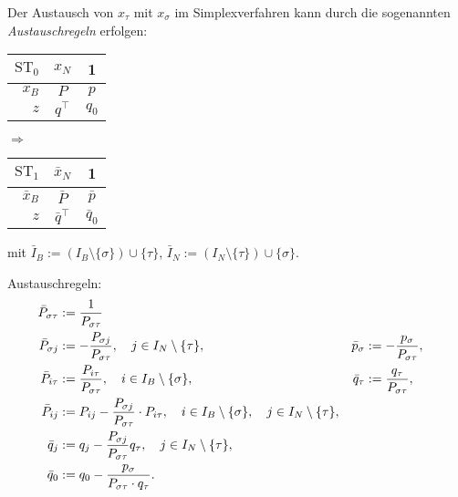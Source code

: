 Der Austausch von $x_\tau$ mit $x_\sigma$ im Simplexverfahren kann durch die
sogenannten \emph{Austauschregeln} erfolgen:
\begin{center}
  \begin{tabular}{r|cc}
    $\mathrm{ST}_0$ & $x_N$ & 1 \\
    \hline
    $x_B$ & $P$ & $p$ \\
    \hline
    $z$ & $q^\top$ & $q_0$
  \end{tabular}
  \hspace{1cm}
  $\Rightarrow$
  \hspace{1cm}
  \begin{tabular}{r|cc}
    $\mathrm{ST}_1$ & $\bar{x}_N$ & 1 \\
    \hline
    $\bar{x}_B$ & $\bar{P}$ & $\bar{p}$ \\
    \hline
    $z$ & $\bar{q}^\top$ & $\bar{q}_0$
  \end{tabular}  
\end{center}
mit $\bar{I}_B := (I_B \setminus \{ \sigma \} ) \cup \{ \tau \}$, $\bar{I}_N :=
(I_N \setminus \{ \tau \} ) \cup \{ \sigma \}$.

Austauschregeln:
\begin{align*}
  \bar{P}_{\sigma \tau}
  &:= \frac{1}{P_{\sigma \tau}} \\
  \bar{P}_{\sigma j}
  &:= - \frac{P_{\sigma j}}{P_{\sigma \tau}}, \quad
    j \in I_N \setminus \{ \tau \},
  & \bar{p}_\sigma
  &:= - \frac{p_\sigma}{P_{\sigma \tau}}, \\
  \bar{P}_{i \tau}
  &:= \frac{P_{i \tau}}{P_{\sigma \tau}}, \quad
    i \in I_B \setminus \{ \sigma \},
  & \bar{q}_\tau
  &:= \frac{q_\tau}{P_{\sigma \tau}}, \\
  \bar{P}_{ij}
  &:= P_{ij} - \frac{P_{\sigma j}}{P_{\sigma \tau}} \cdot P_{i \tau}, \quad
    i \in I_B \setminus \{\sigma\}, \quad j \in I_N \setminus \{ \tau \}, \\
  \bar{q}_j
  &:= q_j - \frac{P_{\sigma j}}{P_{\sigma \tau}} q_\tau, \quad
    j \in I_N \setminus \{ \tau \}, \\
  \bar{q}_0
  &:= q_0 - \frac{ p_\sigma }{ P_{\sigma \tau} \cdot q_\tau}.
\end{align*}

